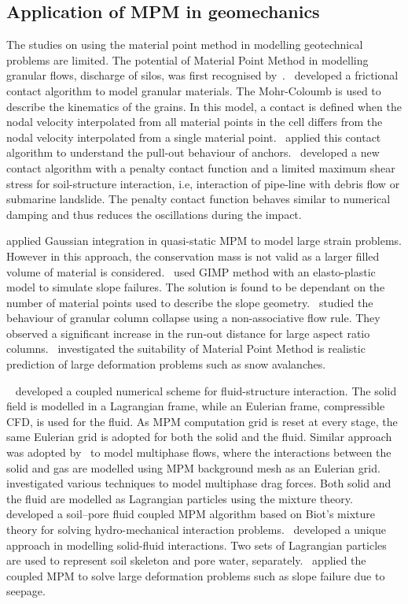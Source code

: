 \subsection{Application of MPM in geomechanics}

The studies on using the material point method in modelling
geotechnical problems are limited. The potential of Material Point Method in 
modelling granular flows, discharge of silos, was first recognised 
by~\citet{Wieckowski1999}.~\citet{Bardenhagen2001} developed a frictional 
contact algorithm to model granular materials. The Mohr-Coloumb is used to 
describe the kinematics of the grains. In this model, a contact is defined when 
the nodal velocity interpolated from all material points in the cell differs 
from the nodal velocity interpolated from a single material 
point.~\citet{Coetzee2005} applied this contact algorithm to understand the 
pull-out behaviour of anchors.~\citet{Ma2014} developed a new contact algorithm 
with a penalty contact function and a limited maximum shear stress for 
soil-structure interaction, i.e, interaction of pipe-line with debris flow or 
submarine landslide. The penalty contact function behaves similar to numerical 
damping and thus reduces the oscillations during the impact. 

\citet{Beuth2010} applied Gaussian integration in quasi-static MPM to model 
large strain problems. However in this approach, the conservation mass is not 
valid as a larger filled volume of material is considered.~\citet{Andersen2010} 
used GIMP method with an elasto-plastic model to simulate slope failures. The 
solution is found to be dependant on the number of material points used to 
describe the slope geometry.~\citet{Mast2014} studied the behaviour of granular 
column collapse using a non-associative flow rule. They observed a 
significant increase in the run-out distance for large aspect ratio 
columns.~\citet{Mast2014a} investigated the suitability of Material Point 
Method is realistic prediction of large deformation problems such as snow 
avalanches. 

~\citet{Guilkey2007} developed a coupled numerical scheme for fluid-structure 
interaction. The solid field is modelled in a Lagrangian frame, while an 
Eulerian frame, compressible CFD, is used for the fluid. As MPM computation 
grid is reset at every stage, the same Eulerian grid is adopted for both the 
solid and the fluid. Similar approach was adopted by~\cite{Zhang2008} to model 
multiphase flows, where the interactions between the solid and gas are modelled 
using MPM background mesh as an Eulerian 
grid.~\citet{Mackenzie-Helnwein2010} investigated various techniques to model 
multiphase drag forces. Both solid and the fluid are modelled as Lagrangian 
particles using the mixture theory.~\citet{Abe2013} developed a soil–pore fluid 
coupled MPM algorithm based on Biot’s mixture theory for solving 
hydro-mechanical interaction problems.~\citet{Bandara2013} developed a unique 
approach in modelling solid-fluid interactions. Two sets of Lagrangian 
particles are used to represent soil skeleton and pore water, 
separately.~\citet{Bandara2013} applied the coupled MPM to solve large 
deformation problems such as slope failure due to seepage.

